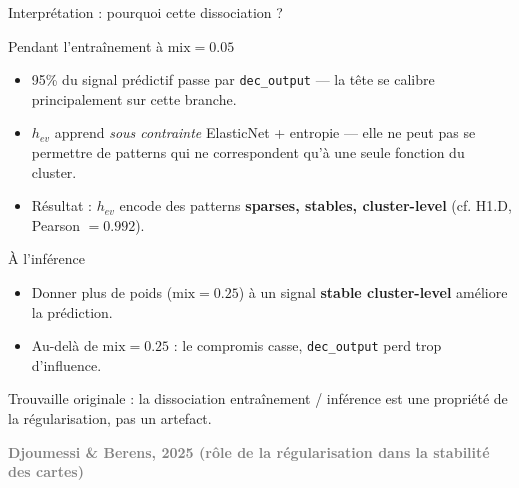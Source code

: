 \documentclass[10pt]{beamer}
\newcommand{\source}[1]{\vspace{4pt}\hfill{\textcolor{gray}{\textbf{\tiny #1}}}}
\begin{document}
\begin{frame}{Interprétation : pourquoi cette dissociation ?}
	\vspace{-0.2cm}
  \begin{block}{Pendant l'entraînement à $\mathrm{mix} = 0.05$}
    \footnotesize
    \begin{itemize}
      \item 95\% du signal prédictif passe par \texttt{dec\_output} --- la tête se calibre principalement sur cette branche.
      \item $h_{ev}$ apprend \emph{sous contrainte} ElasticNet + entropie --- elle ne peut pas se permettre de patterns qui ne correspondent qu'à une seule fonction du cluster.
      \item Résultat : $h_{ev}$ encode des patterns \textbf{sparses, stables, cluster-level} (cf. H1.D, Pearson $= 0.992$).
    \end{itemize}
  \end{block}
\vspace{-0.2cm}
  \begin{block}{À l'inférence}
    \footnotesize
    \begin{itemize}
      \item Donner plus de poids ($\mathrm{mix} = 0.25$) à un signal \textbf{stable cluster-level} améliore la prédiction.
      \item Au-delà de $\mathrm{mix} = 0.25$ : le compromis casse, \texttt{dec\_output} perd trop d'influence.
    \end{itemize}
  \end{block}
\vspace{-0.2cm}
  \begin{interpbox}
    Trouvaille originale : la \alert{dissociation entraînement / inférence} est une propriété de la régularisation, pas un artefact.
  \end{interpbox}
	\vspace{-0.2cm}
  \source{Djoumessi \& Berens, 2025 (rôle de la régularisation dans la stabilité des cartes)}
\end{frame}
\end{document}
